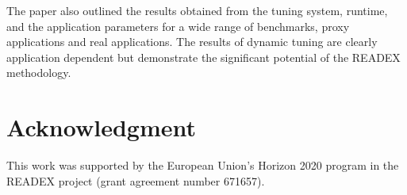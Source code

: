 \documentclass[runningheads]{llncs}
\begin{document}
The paper also outlined the results obtained from the tuning system, runtime, and the application parameters for a wide range of benchmarks, proxy applications and real applications. The results of dynamic tuning are clearly application dependent but demonstrate the significant potential of the READEX methodology.

\section*{Acknowledgment}
This work was supported by the European Union's Horizon 2020 program in the READEX project (grant agreement number 671657).


%
 
 
\end{document}
